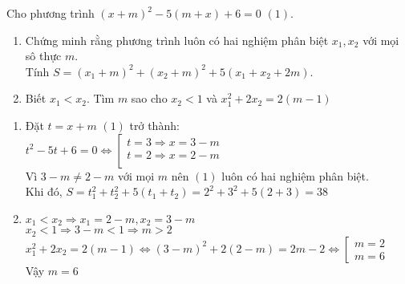 \begin{ex}%
	Cho phương trình $\left(x+m\right)^2-5(m+x)+6=0$ $(1)$.
	\begin{enumerate}
		\item Chứng minh rằng phương trình luôn có hai nghiệm phân biệt $x_1,x_2$ với mọi sô thực $m$.\\
		Tính $S=\left(x_1+m\right)^2+\left(x_2+m\right)^2+5\left(x_1+x_2+2m\right)$.
		\item Biết $x_1 < x_2$. Tìm $m$ sao cho $x_2<1$ và $x_1^2+2x_2=2\left(m-1\right)$
	\end{enumerate}
	\loigiai
	{
		\begin{enumerate}
			\item Đặt $t=x+m$  $(1)$ trở thành:\\
			$t^2-5t+6=0 \Leftrightarrow 
			\left[ \begin{gathered}
			t=3 \Rightarrow x=3-m \\
			t=2\Rightarrow x=2-m\\ 
			\end{gathered}  \right.$\\
			Vì $3-m \neq 2-m$ với mọi $m$ nên $(1)$ luôn có hai nghiệm phân biệt.\\
			Khi đó, $S=t_1^2+t_2^2+5\left(t_1+t_2\right)=2^2+3^2+5\left(2+3\right)=38$
			\item $x_1 < x_2 \Rightarrow x_1= 2-m, x_2 = 3-m$\\
			$x_2<1 \Rightarrow 3-m<1 \Rightarrow m>2$\\
			$x_1^2+2x_2=2\left(m-1\right) \Leftrightarrow \left(3-m\right)^2+2\left(2-m\right)=2m-2\Leftrightarrow \left[ \begin{gathered}
			m=2\\m=6
			\end{gathered}  \right. $\\
			Vậy $m=6$
			
	\end{enumerate}  }
	
\end{ex}

